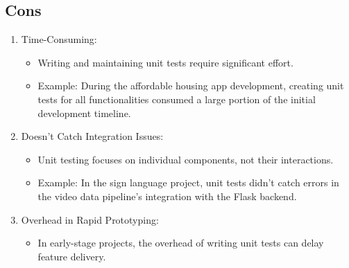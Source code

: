\documentclass[a4paper,12pt]{article}
\begin{document}
\subsection{Cons}
\begin{enumerate}
    \item Time-Consuming:
        \begin{itemize}
            \item  Writing and maintaining unit tests require significant effort.
            \item Example: During the affordable housing app development, creating unit tests for all functionalities consumed a large portion of the initial development timeline.
        \end{itemize}
    \item Doesn’t Catch Integration Issues:
        \begin{itemize}
            \item Unit testing focuses on individual components, not their interactions.
            \item Example: In the sign language project, unit tests didn’t catch errors in the video data pipeline’s integration with the Flask backend.
        \end{itemize}
    \item Overhead in Rapid Prototyping:
        \begin{itemize}
            \item In early-stage projects, the overhead of writing unit tests can delay feature delivery.
        \end{itemize}
\end{enumerate}
\end{document}
